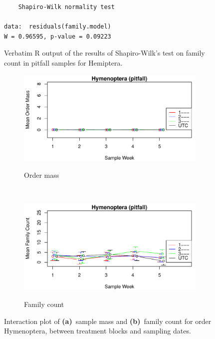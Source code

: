 \documentclass[10pt,letterpaper,twocolumn]{article}
\begin{document}
\begin{figure}[h]
	\lstset{numbers=left}
	\lstset{xleftmargin=5mm,framexleftmargin=5mm}
	\begin{lstlisting}
	Shapiro-Wilk normality test

data:  residuals(family.model)
W = 0.96595, p-value = 0.09223
	\end{lstlisting}
	\caption{Verbatim R output of the results of Shapiro-Wilk's test on family count in pitfall samples for Hemiptera.}
	\label{fig:pitfall_hemiptera_family_shapiro}
	\smallskip
	\nointerlineskip
	\hrulefill
\end{figure}

\begin{figure}[h]
	\centering
	\begin{subfigure}[b]{0.45\textwidth}
		\caption{Order mass}
		\includegraphics[width=\textwidth]{plots/blocks/interaction/mass/mass_pitfall_Hymenoptera_interplot.pdf}
		\label{fig:pitfall_hymenoptera_mass_interplot}
	\end{subfigure}
	~
	\begin{subfigure}[b]{0.45\textwidth}
		\caption{Family count}
		\includegraphics[width=\textwidth]{plots/blocks/interaction/family/family_pitfall_Hymenoptera_interplot.pdf}
		\label{fig:pitfall_hymenoptera_family_interplot}
	\end{subfigure}
	\caption{Interaction plot of \textbf{(a)}~sample mass and \textbf{(b)}~family count for order Hymenoptera, between treatment blocks and sampling dates.}
	\label{fig:pitfall_hymenoptera_interplot}
	\smallskip
	\nointerlineskip
	\hrulefill
\end{figure}
\end{document}
